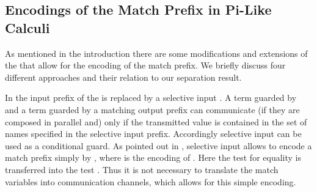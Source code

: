 \documentclass[final,copyright,creativecommons]{eptcs}
\begin{document}
\subsection{Encodings of the Match Prefix in Pi-Like Calculi}
\label{sec:encodeMatchInOtherCalculi}

As mentioned in the introduction there are some modifications and extensions of the \piCal that allow for the encoding of the match prefix. We briefly discuss four different approaches and their relation to our separation result.

In \cite{bodeiDeganoPriami05} the input prefix  of the \piCal is replaced by a selective input . A term guarded by  and a term guarded by a matching output prefix  can communicate (if they are composed in parallel and) only if the transmitted value  is contained in  the set  of names specified in the selective input prefix. Accordingly selective input can be used as a conditional guard. As pointed out in \cite{bodeiDeganoPriami05}, selective input allows to encode a match prefix  simply by , where  is the encoding of . Here the test for equality  is transferred into the test . Thus it is not necessary to translate the match variables into communication channels, which allows for this simple encoding.
\end{document}
